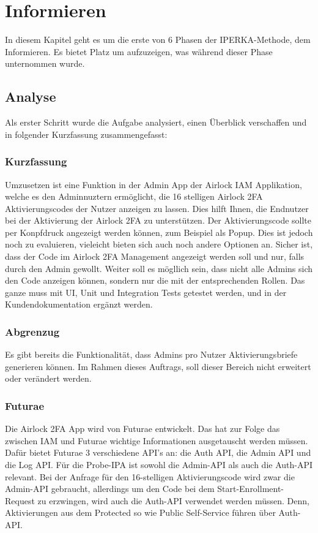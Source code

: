 \chapter{Informieren}\label{ch:informieren}

In diesem Kapitel geht es um die erste von 6 Phasen der IPERKA-Methode, dem Informieren. Es bietet Platz um aufzuzeigen, was während dieser Phase unternommen wurde.

\section{Analyse}
Als erster Schritt wurde die Aufgabe analysiert, einen Überblick verschaffen und in folgender Kurzfassung zusammengefasst:
\subsection*{Kurzfassung}
Umzusetzen ist eine Funktion in der Admin App der Airlock IAM Applikation, welche es den Adminnuztern ermöglicht, die 16 stelligen Airlock 2FA Aktivierungscodes der Nutzer anzeigen zu lassen. Dies hilft Ihnen, die Endnutzer bei der Aktivierung der Airlock 2FA zu unterstützen. Der Aktivierungscode sollte per Konpfdruck angezeigt werden können, zum Beispiel als Popup. Dies ist jedoch noch zu evaluieren, vieleicht bieten sich auch noch andere Optionen an. Sicher ist, dass der Code im Airlock 2FA Management angezeigt werden soll und nur, falls durch den Admin gewollt. \newline
Weiter soll es mögllich sein, dass nicht alle Admins sich den Code anzeigen können, sondern nur die mit der entsprechenden Rollen. \newline
Das ganze muss mit UI, Unit und Integration Tests getestet werden, und in der Kundendokumentation ergänzt werden.

\subsection*{Abgrenzug}
Es gibt bereits die Funktionalität, dass Admins pro Nutzer Aktivierungsbriefe generieren können. Im Rahmen dieses Auftrags, soll dieser Bereich nicht erweitert oder verändert werden.

\subsection{Futurae}
Die Airlock 2FA App wird von Futurae entwickelt. Das hat zur Folge das zwischen IAM und Futurae wichtige Informationen ausgetauscht werden müssen. Dafür bietet Futurae 3 verschiedene API's an: die Auth API, die Admin API und die Log API. Für die Probe-IPA ist sowohl die Admin-API als auch die Auth-API relevant. Bei der Anfrage für den 16-stelligen Aktivierungscode wird zwar die Admin-API gebraucht, allerdings um den Code bei dem Start-Enrollment-Request zu erzwingen, wird auch die Auth-API verwendet werden müssen. Denn, Aktivierungen aus dem Protected so wie Public Self-Service führen über Auth-API. 

